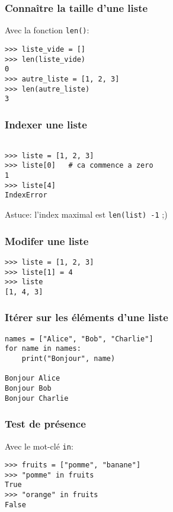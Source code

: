 \documentclass{beamer}
\begin{document}
\begin{frame}[fragile]
  \frametitle{Connaître la taille d'une liste}
Avec la fonction \texttt{len()}:

\vfill

\begin{lstlisting}
>>> liste_vide = []
>>> len(liste_vide)
0
>>> autre_liste = [1, 2, 3]
>>> len(autre_liste)
3
\end{lstlisting}

\end{frame}



\begin{frame}[fragile]
  \frametitle{Indexer une liste}

\begin{lstlisting}

>>> liste = [1, 2, 3]
>>> liste[0]   # ca commence a zero
1
>>> liste[4]
IndexError
\end{lstlisting}

\vfill

Astuce: l'index maximal est \texttt{len(list) -1} ;)

\end{frame}

\begin{frame}[fragile]
  \frametitle{Modifer une liste}
\begin{lstlisting}
>>> liste = [1, 2, 3]
>>> liste[1] = 4
>>> liste
[1, 4, 3]
\end{lstlisting}

\end{frame}

\begin{frame}[fragile]
  \frametitle{Itérer sur les éléments d'une liste}
\begin{lstlisting}
names = ["Alice", "Bob", "Charlie"]
for name in names:
    print("Bonjour", name)

Bonjour Alice
Bonjour Bob
Bonjour Charlie
\end{lstlisting}

\end{frame}

\begin{frame}[fragile]
  \frametitle{Test de présence}

Avec le mot-clé \texttt{in}:

\vfill

\begin{lstlisting}
>>> fruits = ["pomme", "banane"]
>>> "pomme" in fruits
True
>>> "orange" in fruits
False
\end{lstlisting}

\end{frame}
\end{document}
